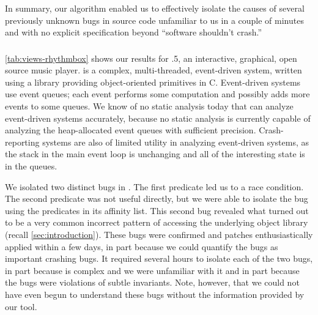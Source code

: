 In summary, our algorithm enabled us to effectively isolate the causes
of several previously unknown bugs in source code unfamiliar to us in
a couple of minutes and with no explicit specification beyond
``software shouldn't crash.''

\subsubsection{\rhythmbox}

\begingroup
\setlength{\segunit}{10pt}
\endgroup

\autoref{tab:views-rhythmbox} shows our results for .5,
an interactive, graphical, open source music player.  \rhythmbox is a
complex, multi-threaded, event-driven system, written using a library
providing object-oriented primitives in C.  Event-driven systems use
event queues; each event performs some computation and possibly adds
more events to some queues.  We know of no static analysis today that
can analyze event-driven systems accurately, because no static
analysis is currently capable of analyzing the heap-allocated event
queues with sufficient precision.  Crash-reporting systems are also of
limited utility in analyzing event-driven systems, as the stack in the
main event loop is unchanging and all of the interesting state is in
the queues.

We isolated two distinct bugs in \rhythmbox.  The first predicate led
us to a race condition.  The second predicate was not useful directly,
but we were able to isolate the bug using the predicates in its
affinity list.  This second bug revealed what turned out to be a very
common incorrect pattern of accessing the underlying object library
(recall \autoref{sec:introduction}).  These bugs
were confirmed and patches enthusiastically applied within a few days, in part because
we could quantify the bugs as important crashing bugs.  It required
several hours to isolate each of the two bugs, in part because \rhythmbox
is complex and we were unfamiliar with it and in part because the bugs
were violations of subtle invariants.  Note, however, that we could not have 
even begun to
understand these bugs without the information provided by our tool.


